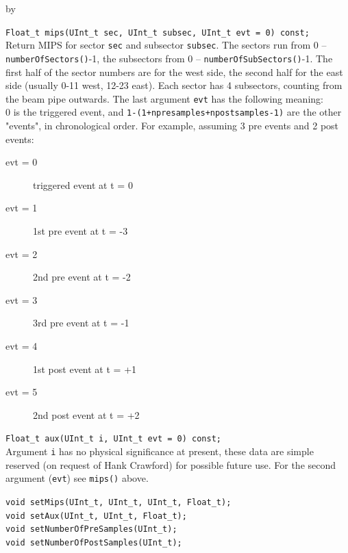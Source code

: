\documentclass[twoside]{article}
\newcommand{\entrylabel}[1]{\mbox{\textbf{{#1}}}\hfil}%
\newenvironment{entry}
{\begin{list}{}%
    {\renewcommand{\makelabel}{\entrylabel}%
     \setlength{\labelwidth}{90pt}%
     \setlength{\leftmargin}{\labelwidth}
     \advance\leftmargin by \labelsep%
      }%
    }%
  {\end{list}}
\newcommand{\Entrylabel}[1]%
{\raisebox{0pt}[1ex][0pt]{\makebox[\labelwidth][l]%
    {\parbox[t]{\labelwidth}{\hspace{0pt}\textbf{{#1}}}}}}
\newenvironment{Entry}%
{\renewcommand{\entrylabel}{\Entrylabel}\begin{entry}}%
  {\end{entry}}
\begin{document}
\begin{Entry}
    \verb+Float_t mips(UInt_t sec, UInt_t subsec, UInt_t evt = 0) const;+\\
    Return MIPS for sector \texttt{sec} and subsector \texttt{subsec}.
    The sectors run from 0 -- \texttt{numberOfSectors()}-1, the
    subsectors from 0 -- \texttt{numberOfSubSectors()}-1. The first
    half of the sector numbers are for the west side, the second half
    for the east side (usually 0-11 west, 12-23 east). Each sector has
    4 subsectors, counting from the beam pipe outwards. The last
    argument \texttt{evt} has
    the following meaning:\\
    0 is the triggered event, and
    \texttt{1-(1+npresamples+npostsamples-1)} are the other "events",
    in chronological order.  For example, assuming 3 pre events and 2
    post events:
    \begin{description}
    \item[evt = 0] triggered event at t = 0
    \item[evt = 1] 1st pre event at t = -3
    \item[evt = 2] 2nd pre event at t = -2
    \item[evt = 3] 3rd pre event at t = -1
    \item[evt = 4] 1st post event at t = +1
    \item[evt = 5] 2nd post event at t = +2
    \end{description}    
       
    \verb+Float_t aux(UInt_t i, UInt_t evt = 0) const;+\\
    Argument \texttt{i} has no physical significance at present, these
    data are simple reserved (on request of Hank Crawford) for
    possible future use.  For the second argument (\texttt{evt}) see
    \texttt{mips()} above.
    
    \verb+void setMips(UInt_t, UInt_t, UInt_t, Float_t);+\\
    \verb+void setAux(UInt_t, UInt_t, Float_t);+\\
    \verb+void setNumberOfPreSamples(UInt_t);+\\
    \verb+void setNumberOfPostSamples(UInt_t);+\\
\end{Entry}
\clearpage
\end{document}
